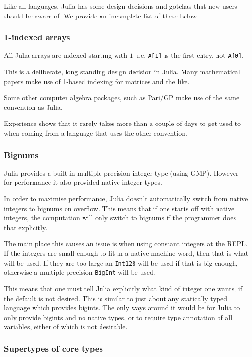\documentclass[a4paper,10pt]{article}
\newcommand{\code}{\lstinline}
\begin{document}
Like all languages, Julia has some design decisions and gotchas that new users should be aware of. We
provide an incomplete list of these below.

\subsubsection{1-indexed arrays}

All Julia arrays are indexed starting with $1$, i.e. \code{A[1]} is the first entry, not \code{A[0]}.

This is a deliberate, long standing design decision in Julia. Many mathematical papers make use of
1-based indexing for matrices and the like. 

Some other computer algebra packages, such as Pari/GP make use of the same convention as Julia. 

Experience shows that it rarely takes more than a couple of days to get used to when coming from a
language that uses the other convention.

\subsubsection{Bignums}

Julia provides a built-in multiple precision integer type (using GMP). However for performance it also
provided native integer types.

In order to maximise performance, Julia doesn't automatically switch from native integers to bignums on
overflow. This means that if one starts off with native integers, the computation will only switch to
bignums if the programmer does that explicitly.

The main place this causes an issue is when using constant integers at the REPL. If the integers are
small enough to fit in a native machine word, then that is what will be used. If they are too large
an \code{Int128} will be used if that is big enough, otherwise a multiple precision \code{BigInt}
will be used. 

This means that one must tell Julia explicitly what kind of integer one wants, if the default is not
desired. This is similar to just about any statically typed language which provides bigints. The only
ways around it would be for Julia to only provide bigints and no native types, or to require type
annotation of all variables, either of which is not desirable.

\subsubsection{Supertypes of core types}
\end{document}
